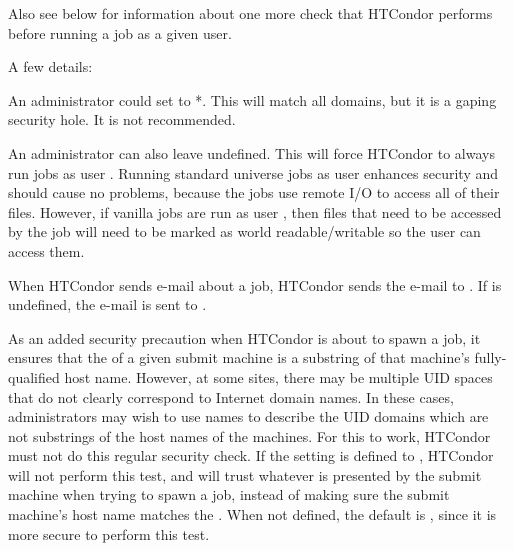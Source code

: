 \begin{description}
  Also see 
  below for information about one more check
  that HTCondor performs before running a job as a given user.

  A few details:

  An administrator could set 
  to *. This will match all domains,
  but it is a gaping security hole. It is not recommended.

  An administrator can also leave  undefined.
  This will force HTCondor to always run jobs as user .
  Running standard universe jobs as user  enhances
  security and should cause no problems, because the jobs use remote
  I/O to access all of their files.
  However, if vanilla jobs are run as
  user , then files that need to be accessed by the job will need
  to be marked as world readable/writable so the user  can access
  them.

  When HTCondor sends e-mail about a job, HTCondor sends the e-mail to
  .
  If 
  is undefined, the e-mail is sent to .


\label{param:TrustUidDomain}
\item[\Macro{TRUST\_UID\_DOMAIN}]
  As an added security precaution when HTCondor is about to spawn a job,
  it ensures that the  of a given
  submit machine is a substring of that machine's fully-qualified
  host name.
  However, at some sites, there may be multiple UID spaces that do
  not clearly correspond to Internet domain names.
  In these cases, administrators may wish to use names to describe the
  UID domains which are not substrings of the host names of the
  machines.
  For this to work, HTCondor must not do this regular security check.
  If the  setting is defined to ,
  HTCondor will not perform this test, and will trust whatever
   is presented by the submit machine when trying
  to spawn a job, instead of making sure the submit machine's host name
  matches the .
  When not defined, the default is ,
  since it is more secure to perform this test. 


\end{description}

